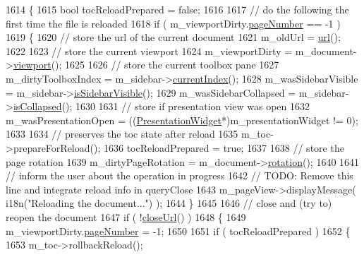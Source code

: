 \begin{DoxyCode}
1614 \{
1615     \textcolor{keywordtype}{bool} tocReloadPrepared = \textcolor{keyword}{false};
1616     
1617     \textcolor{comment}{// do the following the first time the file is reloaded}
1618     \textcolor{keywordflow}{if} ( m\_viewportDirty.\hyperlink{classOkular_1_1DocumentViewport_a122674d4a493e79b1aa5fd5c00e81c93}{pageNumber} == -1 )
1619     \{
1620         \textcolor{comment}{// store the url of the current document}
1621         m\_oldUrl = \hyperlink{classKParts_1_1ReadOnlyPart_aba05c3b2fd42dcfebc6585e4f746d2cb}{url}();
1622 
1623         \textcolor{comment}{// store the current viewport}
1624         m\_viewportDirty = m\_document->\hyperlink{classOkular_1_1Document_abb8738de0a53aa4a9f552de0e1e749f8}{viewport}();
1625 
1626         \textcolor{comment}{// store the current toolbox pane}
1627         m\_dirtyToolboxIndex = m\_sidebar->\hyperlink{classSidebar_a87085cfe9098de2cd21dff4f13f4df5a}{currentIndex}();
1628         m\_wasSidebarVisible = m\_sidebar->\hyperlink{classSidebar_af919caad848a5f5079b275bdd4666409}{isSidebarVisible}();
1629         m\_wasSidebarCollapsed = m\_sidebar->\hyperlink{classSidebar_a7faa5e2df81f4fc935dfc85cead3efe6}{isCollapsed}();
1630 
1631         \textcolor{comment}{// store if presentation view was open}
1632         m\_wasPresentationOpen = ((\hyperlink{classPresentationWidget}{PresentationWidget}*)m\_presentationWidget != 0);
1633         
1634         \textcolor{comment}{// preserves the toc state after reload}
1635         m\_toc->prepareForReload();
1636         tocReloadPrepared = \textcolor{keyword}{true};
1637 
1638         \textcolor{comment}{// store the page rotation}
1639         m\_dirtyPageRotation = m\_document->\hyperlink{classOkular_1_1Document_aa419f95f101b5672926c7cd4485f12e6}{rotation}();
1640 
1641         \textcolor{comment}{// inform the user about the operation in progress}
1642         \textcolor{comment}{// TODO: Remove this line and integrate reload info in queryClose}
1643         m\_pageView->displayMessage( i18n(\textcolor{stringliteral}{"Reloading the document..."}) );
1644     \}
1645 
1646     \textcolor{comment}{// close and (try to) reopen the document}
1647     \textcolor{keywordflow}{if} ( !\hyperlink{classOkular_1_1Part_a580d15b57647e05bf4b5d7674efc4dee}{closeUrl}() )
1648     \{
1649         m\_viewportDirty.\hyperlink{classOkular_1_1DocumentViewport_a122674d4a493e79b1aa5fd5c00e81c93}{pageNumber} = -1;
1650 
1651         \textcolor{keywordflow}{if} ( tocReloadPrepared ) 
1652         \{
1653             m\_toc->rollbackReload();

\end{DoxyCode}
